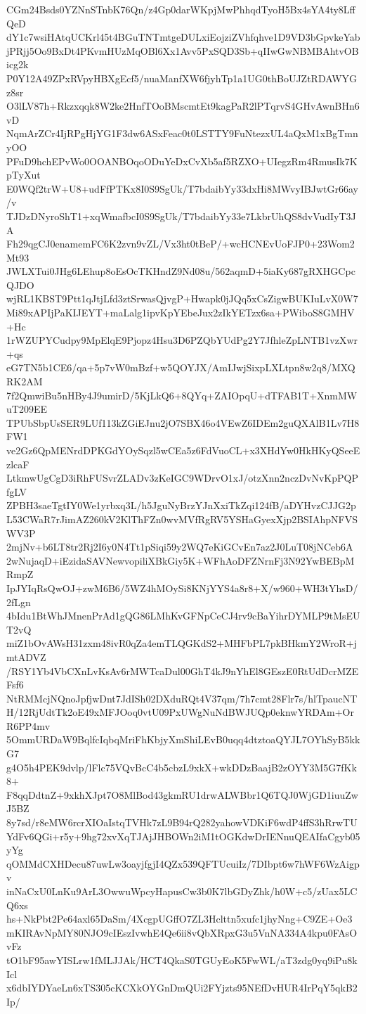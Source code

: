 CGm24Bsds0YZNnSTnbK76Qn/z4Gp0darWKpjMwPhhqdTyoH5Bx4sYA4ty8LffQeD
dY1c7wsiHAtqUCKrl45t4BGuTNTmtgeDULxiEojziZVhfqhve1D9VD3bGpvkeYab
jPRjj5Oo9BxDt4PKvmHUzMqOBl6Xx1Avv5PxSQD3Sb+qIIwGwNBMBAhtvOBicg2k
P0Y12A49ZPxRVpyHBXgEcf5/nuaManfXW6fjyhTp1a1UG0thBoUJZtRDAWYGz8sr
O3lLV87h+Rkzxqqk8W2ke2HnfTOoBMscmtEt9kagPaR2lPTqrvS4GHvAwnBHn6vD
NqmArZCr4IjRPgHjYG1F3dw6ASxFeac0t0LSTTY9FuNtezxUL4aQxM1xBgTmnyOO
PFuD9hchEPvWo0OOANBOqoODuYeDxCvXb5af5RZXO+UIegzRm4RmusIk7KpTyXut
E0WQf2trW+U8+udFfPTKx8I0S9SgUk/T7bdaibYy33dxHi8MWvyIBJwtGr66ay/v
TJDzDNyroShT1+xqWmafbcI0S9SgUk/T7bdaibYy33e7LkbrUhQS8dvVudIyT3JA
Fh29qgCJ0enamemFC6K2zvn9vZL/Vx3ht0tBeP/+wcHCNEvUoFJP0+23Wom2Mt93
JWLXTui0JHg6LEhup8oEsOcTKHndZ9Nd08u/562aqmD+5iaKy687gRXHGCpcQJDO
wjRL1KBST9Ptt1qJtjLfd3ztSrwasQjvgP+Hwapk0jJQq5xCsZigwBUKIuLvX0W7
Mi89xAPIjPaKIJEYT+maLalg1ipvKpYEbeJux2zIkYETzx6sa+PWiboS8GMHV+Hc
1rWZUPYCudpy9MpElqE9Pjopz4Hsu3D6PZQbYUdPg2Y7JfhleZpLNTB1vzXwr+qs
eG7TN5b1CE6/qa+5p7vW0mBzf+w5QOYJX/AmIJwjSixpLXLtpn8w2q8/MXQRK2AM
7f2QmwiBu5nHBy4J9umirD/5KjLkQ6+8QYq+ZAIOpqU+dTFAB1T+XnmMWuT209EE
TPUbSbpUsSER9LUf113kZGiEJnu2jO7SBX46o4VEwZ6IDEm2guQXAlB1Lv7H8FW1
ve2Gz6QpMENrdDPKGdYOySqzl5wCEa5z6FdVuoCL+x3XHdYw0HkHKyQSeeEzlcaF
LtkmwUgCgD3iRhFUSvrZLADv3zKeIGC9WDrvO1xJ/otzXnn2nczDvNvKpPQPfgLV
ZPBH3saeTgtIY0We1yrbxq3L/h5JguNyBrzYJnXxiTkZqi124fB/aDYHvzCJJG2p
L53CWaR7rJimAZ260kV2KlThFZn0wvMVfRgRV5YSHaGyexXjp2BSIAhpNFVSWV3P
2mjNv+b6LT8tr2Rj2I6y0N4Tt1pSiqi59y2WQ7eKiGCvEn7az2J0LuT08jNCeb6A
2wNujaqD+iEzidaSAVNewvopiliXBkGiy5K+WFhAoDFZNrnFj3N92YwBEBpMRmpZ
IpJYIqRsQwOJ+zwM6B6/5WZ4hMOySi8KNjYYS4a8r8+X/w960+WH3tYhsD/2fLgn
4bIdu1BtWhJMnenPrAd1gQG86LMhKvGFNpCeCJ4rv9cBaYihrDYMLP9tMsEUT2vQ
miZ1bOvAWsH31zxm48ivR0qZa4emTLQGKdS2+MHFbPL7pkBHkmY2WroR+jmtADVZ
/RSY1Yb4VbCXnLvKsAv6rMWTcaDul00GhT4kJ9nYhEl8GEszE0RtUdDcrMZEFsf6
NtRMMcjNQnoJpfjwDnt7JdISh02DXduRQt4V37qm/7h7cmt28Flr7s/hlTpaucNT
H/12RjUdtTk2oE49xMFJOoq0vtU09PxUWgNuNdBWJUQp0eknwYRDAm+OrR6PP4mv
5OmmURDaW9BqlfcIqbqMriFhKbjyXmShiLEvB0uqq4dtztoaQYJL7OYhSyB5kkG7
g4O5h4PEK9dvlp/lFlc75VQvBcC4b5cbzL9xkX+wkDDzBaajB2zOYY3M5G7fKk8+
F8qqDdtnZ+9xkhXJpt7O8MlBod43gkmRU1drwALWBbr1Q6TQJ0WjGD1iuuZwJ5BZ
8y7sd/r8eMW6rcrXIOaIstqTVHk7zL9B94rQ282yahowVDKiF6wdP4ffS3hRrwTU
YdFv6QGi+r5y+9hg72xvXqTJAjJHBOWn2iM1tOGKdwDrIENnuQEAIfaCgyb05yYg
qOMMdCXHDecu87uwLw3oayjfgjI4QZx539QFTUcuiIz/7DIbpt6w7hWF6WzAigpv
inNaCxU0LnKu9ArL3OwwuWpcyHapusCw3b0K7lbGDyZhk/h0W+c5/zUax5LCQ6xs
hs+NkPbt2Pe64axl65DaSm/4XcgpUGffO7ZL3Hclttn5xufc1jhyNng+C9ZE+Oe3
mKIRAvNpMY80NJO9cIEszIvwhE4Qe6ii8vQbXRpxG3u5VnNA334A4kpu0FAsOvFz
tO1bF95awYISLrw1fMLJJAk/HCT4QkaS0TGUyEoK5FwWL/aT3zdg0yq9iPu8kIcl
x6dbIYDYaeLn6xTS305cKCXkOYGnDmQUi2FYjzts95NEfDvHUR4IrPqY5qkB2Ip/
